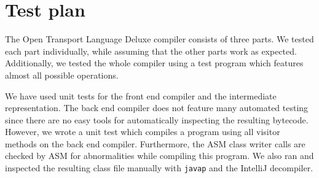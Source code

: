 \chapter{Test plan}

The Open Transport Language Deluxe compiler consists of three parts.
We tested each part individually, while assuming that the other parts work as expected.
Additionally, we tested the whole compiler using a test program which features almost all possible operations.

We have used unit tests for the front end compiler and the intermediate representation.
The back end compiler does not feature many automated testing since there are no easy tools for automatically inspecting the resulting bytecode.
However, we wrote a unit test which compiles a program using all visitor methods on the back end compiler.
Furthermore, the ASM class writer calls are checked by ASM for abnormalities while compiling this program.
We also ran and inspected the resulting class file manually with \texttt{javap} and the IntelliJ decompiler.
